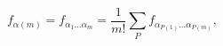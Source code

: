 \begin{equation}
f_{\alpha(m)}=f_{\alpha_1\ldots\alpha_m}
=\frac{1}{m!}\sum_Pf_{\alpha_{P(1)}\ldots\alpha_{P(m)}},
\end{equation}

